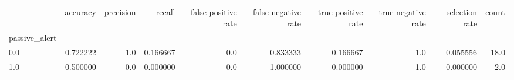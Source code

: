 \begin{tabular}{lrrrrrrrrr}
\toprule
{} &  accuracy &  precision &    recall &  false positive rate &  false negative rate &  true positive rate &  true negative rate &  selection rate &  count \\
passive\_alert &           &            &           &                      &                      &                     &                     &                 &        \\
\midrule
0.0           &  0.722222 &        1.0 &  0.166667 &                  0.0 &             0.833333 &            0.166667 &                 1.0 &        0.055556 &   18.0 \\
1.0           &  0.500000 &        0.0 &  0.000000 &                  0.0 &             1.000000 &            0.000000 &                 1.0 &        0.000000 &    2.0 \\
\bottomrule
\end{tabular}
